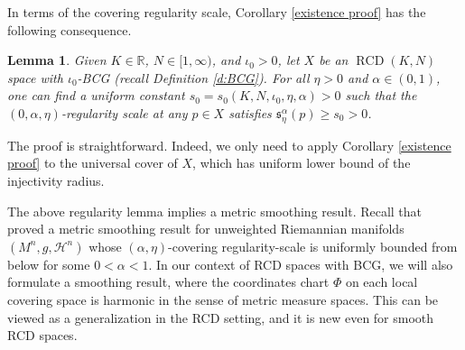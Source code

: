\documentclass[11pt,reqno]{amsart}
\newtheorem{lemma}[theorem]{Lemma}
\theoremstyle{definition}
\numberwithin{equation}{section}
\newcommand{\dR}{\mathbb{R}}
\DeclareMathOperator{\RCD}{RCD}
\newcommand{\haus}{\mathscr{H}}
\begin{document}
In terms of 
the covering regularity scale,  Corollary \ref{existence proof} has the following consequence. 
\begin{lemma} \label{l:covering-regularity-scale}
Given $K\in \dR$, $N \in [1, \infty)$, and $\iota_0 > 0$, let $X$ be an $\RCD(K, N)$ space with $\iota_0$-BCG (recall Definition \ref{d:BCG}). For all $\eta > 0$ and $\alpha \in (0,1)$, one can find a uniform constant 
$
s_0  = s_0 (K, N, \iota_0, \eta, \alpha) > 0
$
such that the  $(0,\alpha, \eta)$-regularity scale at any $p \in X$ satisfies $\mathfrak{s}_{\eta}^{\alpha}(p) \geq  s_0 > 0$.
\end{lemma}
The proof is straightforward. Indeed, we only need to apply Corollary \ref{existence proof} to the universal cover of $X$, which has uniform lower bound of the injectivity radius.
	



The above regularity lemma implies a metric smoothing result. Recall that \cite[Theorem~1.1]{PWY} proved a metric
smoothing result for unweighted Riemannian manifolds $(M^n, g, \haus^n)$ whose $(\alpha , \eta)$-covering
 regularity-scale is uniformly bounded from below for some $0 < \alpha < 1$. 
In our context of RCD spaces with BCG, we will also formulate a smoothing result, where the coordinates chart $\Phi$ on each local covering space is harmonic in the sense of metric measure spaces. 
This can be viewed as a generalization in the RCD setting, and it
is new even for smooth RCD spaces.

 
\end{document}
